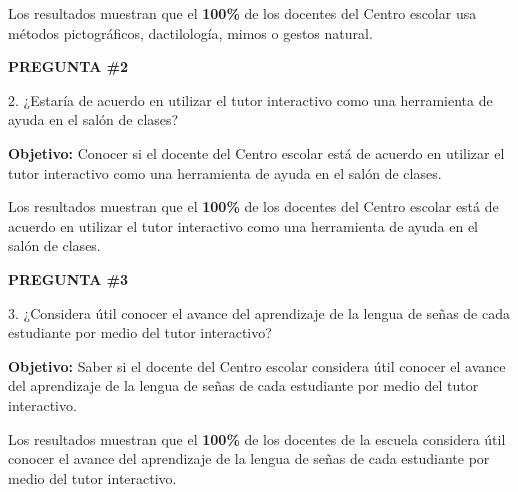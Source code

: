 \documentclass[12pt]{report}%
\begin{document}
\begin{center}
\end{center}


Los resultados muestran que el \textbf{ 100\%} de los docentes del Centro escolar usa métodos pictográficos, dactilología, mimos o gestos natural.

\newpage
\textbf{PREGUNTA \#2}

2. ¿Estaría de acuerdo en utilizar el tutor interactivo como una herramienta de ayuda en el salón de clases?

\textbf{Objetivo:} Conocer si el docente del Centro escolar está de acuerdo en utilizar el tutor interactivo como una herramienta de ayuda en el salón de clases.


\begin{center}
\end{center}


Los resultados muestran que el \textbf{ 100\%} de los docentes del Centro escolar está de acuerdo en utilizar el tutor interactivo como una herramienta de ayuda en el salón de clases.

\newpage
\textbf{PREGUNTA \#3}

3. ¿Considera útil conocer el avance del aprendizaje de la lengua de señas de cada estudiante por medio del tutor interactivo?

\textbf{Objetivo:} Saber si el docente del Centro escolar considera útil conocer el avance del aprendizaje de la lengua de señas de cada estudiante por medio del tutor interactivo.


\begin{center}
\end{center}


Los resultados muestran que el \textbf{ 100\%} de los docentes de la escuela considera útil conocer el avance del aprendizaje de la lengua de señas de cada estudiante por medio del tutor interactivo.
\end{document}
